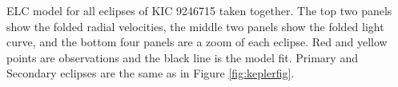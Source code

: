 \label{fig:ELCresult} ELC model for all eclipses of KIC 9246715 taken together. The top two panels show the folded radial velocities, the middle two panels show the folded light curve, and the bottom four panels are a zoom of each eclipse. Red and yellow points are observations and the black line is the model fit. Primary and Secondary eclipses are the same as in Figure \ref{fig:keplerfig}.